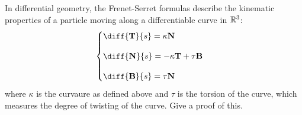 \documentclass[11pt]{article}
\begin{document}
\begin{exercise}
  In differential geometry, the Frenet-Serret formulas describe the kinematic properties of a particle moving along a differentiable curve in \(\mathbb{R}^3\):
  \begin{equation*}
    \begin{cases}
      \diff{\bf{T}}{s} = \kappa\bf{N} \\[10pt]
      \diff{\bf{N}}{s} = -\kappa\bf{T} + \tau\bf{B} \\[10pt]
      \diff{\bf{B}}{s} = \tau\bf{N}
    \end{cases}
  \end{equation*}
  where \(\kappa\) is the curvaure as defined above and \(\tau\) is the torsion of the curve, which measures the degree of twisting of the curve. Give a proof of this.
\end{exercise}
\begin{solution}
\end{solution}

\end{document}
